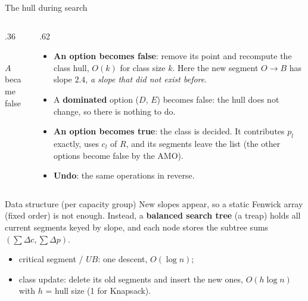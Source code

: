\documentclass[aspectratio=169,11pt]{beamer}
\begin{document}
\begin{frame}{The hull during search}
\footnotesize
\begin{columns}[T]
\begin{column}{.36\textwidth}
\centering
{}\\
\scriptsize $A$ became false
\end{column}
\begin{column}{.62\textwidth}
\begin{itemize}\setlength\itemsep{2pt}
\item \textbf{An option becomes false}: remove its point and recompute the class hull, $O(k)$ for class size $k$.
  Here the new segment $O\to B$ has slope $2.4$, \emph{a slope that did not exist before}.
\item A \textbf{dominated} option ($D$, $E$) becomes false: the hull does not change, so there is nothing to do.
\item \textbf{An option becomes true}: the class is decided. It contributes $p_l$ exactly, uses $c_l$ of $R$, and its
  segments leave the list (the other options become false by the AMO).
\item \textbf{Undo}: the same operations in reverse.
\end{itemize}
\end{column}
\end{columns}
\vspace{1mm}
\begin{block}{Data structure (per capacity group)}\scriptsize
New slopes appear, so a static Fenwick array (fixed order) is not enough. Instead, a \textbf{balanced search tree} (a treap)
holds all current segments keyed by slope, and each node stores the subtree sums $(\sum\Delta c, \sum\Delta p)$.
\begin{itemize}\setlength\itemsep{0pt}
\item critical segment / $UB$: one descent, $O(\log n)$;
\item class update: delete its old segments and insert the new ones, $O(h \log n)$ with $h$ = hull size (1 for Knapsack).
\end{itemize}
\end{block}
\end{frame}
\end{document}
